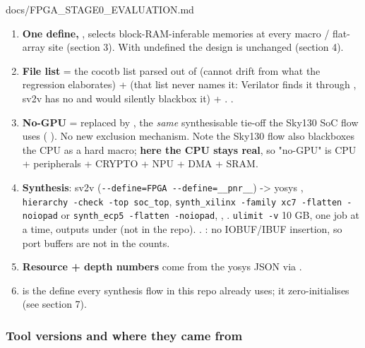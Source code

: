 \begin{relocated}{docs/FPGA_STAGE0_EVALUATION.md}
\begin{enumerate}
\def\labelenumi{\arabic{enumi}.}
\tightlist
\item
  \textbf{One define, }, selects block-RAM-inferable memories
  at every macro / flat-array site (section 3). With 
  undefined the design is unchanged (section 4).
\item
  \textbf{File list} = the cocotb  list parsed out of
   (cannot drift from what the regression
  elaborates) +  (that list never names
  it: Verilator finds it through , sv2v has no  and
  would silently blackbox it) + .
  .
\item
  \textbf{No-GPU} =  replaced by
  , the \emph{same} synthesisable
  tie-off the Sky130 SoC flow uses (
  ). No new exclusion mechanism. Note the
  Sky130 flow also blackboxes the CPU as a hard macro; \textbf{here the
  CPU stays real}, so "no-GPU" is CPU + peripherals + CRYPTO + NPU + DMA
  + SRAM.
\item
  \textbf{Synthesis}: sv2v
  (\texttt{-\allowbreak{}-\allowbreak{}define=\allowbreak{}FPGA\ -\allowbreak{}-\allowbreak{}define=\allowbreak{}\_\allowbreak{}\_\allowbreak{}pnr\_\allowbreak{}\_\allowbreak{}})
  -\textgreater{} yosys ,
  \texttt{hierarchy\ -\allowbreak{}check\ -\allowbreak{}top\ soc\_\allowbreak{}top},
  \texttt{synth\_\allowbreak{}xilinx\ -\allowbreak{}family\ xc7\ -\allowbreak{}flatten\ -\allowbreak{}noiopad}
  or
  \texttt{synth\_\allowbreak{}ecp5\ -\allowbreak{}flatten\ -\allowbreak{}noiopad},
  , . \texttt{ulimit\ -\allowbreak{}v} 10
  GB, one job at a time, outputs under
   (not in the repo).
  . : no
  IOBUF/\allowbreak{}IBUF insertion, so port buffers are not in the
  counts.
\item
  \textbf{Resource + depth numbers} come from the yosys JSON via
  .
\item
   is the define every synthesis flow in this repo already
  uses; it zero-initialises  (see section 7).
\end{enumerate}

\subsubsection{Tool versions and where they came from}\label{tm:dec:fpga-stage0-evaluation:tool-versions-and-where-they-came-from}


\end{relocated}
